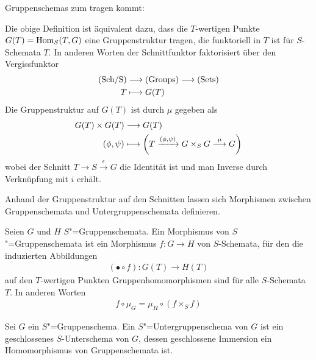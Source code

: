 Gruppenschemas zum tragen kommt:
\begin{Bemerkung}
  Die obige Definition ist äquivalent dazu, dass die $T$-wertigen Punkte
  $G(T)=\operatorname{Hom}_S(T,G)$ eine Gruppenstruktur tragen, die funktoriell in
  $T$ ist für $S$-Schemata $T$.
  In anderen Worten der Schnittfunktor faktorisiert über den
  Vergissfunktor
  \begin{align*}
    \text{(Sch/S)} &\longrightarrow \text{(Groups)} \longrightarrow \text{(Sets)}\\
    T &\longmapsto G(T)
  \end{align*}
  Die Gruppenstruktur auf $G(T)$ ist durch $\mu$ gegeben als
  \begin{align*}
    G(T)\times G(T) &\longrightarrow G(T)\\
    (\phi, \psi) &\longmapsto 
                   \left(
                   T\xrightarrow{(\phi,\psi)} G\times_S G
                   \overset{\mu}{\longrightarrow} G
                   \right)
  \end{align*}
  wobei der Schnitt $T\to S\xrightarrow{\epsilon} G$ die
  Identität ist und man Inverse durch Verknüpfung mit $i$ erhält.
\end{Bemerkung}

Anhand der Gruppenstruktur auf den Schnitten lassen sich
Morphismen zwischen Gruppenschemata und Untergruppenschemata
definieren.
\begin{Definition}
  Seien $G$ und $H$ $S$"=Gruppenschemata.
  Ein Morphismus von $S$"=Gruppenschemata ist ein Morphismus $f\colon
  G\to H$ von $S$-Schemata, für den die induzierten Abbildungen
  \begin{gather*}
    (\bullet\circ f)\colon G(T)\to H(T)
  \end{gather*}auf den $T$-wertigen Punkten
  Gruppenhomomorphismen sind für alle $S$-Schemata $T$.
  In anderen Worten
  \begin{gather*}
    f\circ\mu_G = \mu_H\circ(f\times_S f)
  \end{gather*}
\end{Definition}

\begin{Definition}[Untergruppenschema]
  Sei $G$ ein $S$"=Gruppenschema.
  Ein $S$"=Untergruppenschema von $G$ ist ein geschlossenes
  $S$-Unterschema von $G$, dessen geschlossene Immersion ein
  Homomorphismus von Gruppenschemata ist.
\end{Definition}

